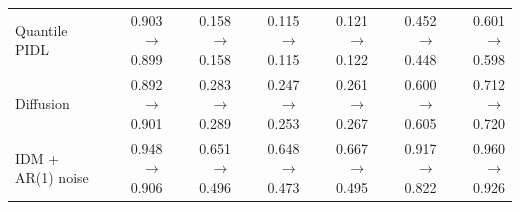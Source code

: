 \begin{table}[htbp]
\begin{tabular}{lrrrrrr}
Quantile PIDL & 0.903 $\rightarrow$ 0.899 & 0.158 $\rightarrow$ 0.158 & 0.115 $\rightarrow$ 0.115 & 0.121 $\rightarrow$ 0.122 & 0.452 $\rightarrow$ 0.448 & 0.601 $\rightarrow$ 0.598 \\
Diffusion & 0.892 $\rightarrow$ 0.901 & 0.283 $\rightarrow$ 0.289 & 0.247 $\rightarrow$ 0.253 & 0.261 $\rightarrow$ 0.267 & 0.600 $\rightarrow$ 0.605 & 0.712 $\rightarrow$ 0.720 \\
IDM + AR(1) noise & 0.948 $\rightarrow$ 0.906 & 0.651 $\rightarrow$ 0.496 & 0.648 $\rightarrow$ 0.473 & 0.667 $\rightarrow$ 0.495 & 0.917 $\rightarrow$ 0.822 & 0.960 $\rightarrow$ 0.926 \\
\bottomrule
\end{tabular}
\end{table}
